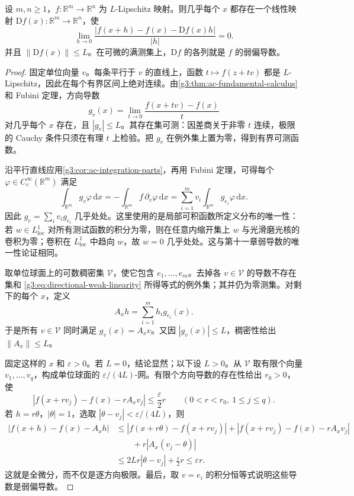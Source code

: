 \begin{theorem}[Rademacher 定理]\label{g3:thm:rademacher}
	设 \(m,n\ge1\)，\(f:\mathbb R^m\to\mathbb R^n\) 为 \(L\)-Lipschitz 映射。则几乎每个 \(x\) 都存在一个线性映射 \(\mathrm Df(x):\mathbb R^m\to\mathbb R^n\)，使
	\begin{equation}\label{g3:eq:rademacher-total-differential}
		\lim_{h\to0}\frac{|f(x+h)-f(x)-\mathrm Df(x)h|}{|h|}=0.
	\end{equation}
	并且 \(\|\mathrm Df(x)\|\le L\)。在可微的满测集上，\(\mathrm Df\) 的各列就是 \(f\) 的弱偏导数。
\end{theorem}
\begin{proof}
	固定单位向量 \(v\)。每条平行于 \(v\) 的直线上，函数 \(t\mapsto f(z+tv)\) 都是 \(L\)-Lipschitz，因此在每个有界区间上绝对连续。由\cref{g3:thm:ac-fundamental-calculus} 和 Fubini 定理，方向导数
	\[
		g_v(x)=\lim_{t\to0}\frac{f(x+tv)-f(x)}t
	\]
	对几乎每个 \(x\) 存在，且 \(|g_v|\le L\)。其存在集可测：因差商关于非零 \(t\) 连续，极限的 Cauchy 条件只须在有理 \(t\) 上检验。把 \(g_v\) 在例外集上置为零，得到有界可测函数。

	沿平行直线应用\cref{g3:cor:ac-integration-parts}，再用 Fubini 定理，可得每个 \(\varphi\in C_c^\infty(\mathbb R^m)\) 满足
	\begin{equation}\label{g3:eq:directional-weak-linearity}
		\int_{\mathbb R^m}g_v\varphi\,\mathrm dx
		=-\int_{\mathbb R^m}f\,\partial_v\varphi\,\mathrm dx
		=\sum_{i=1}^m v_i\int_{\mathbb R^m}g_{e_i}\varphi\,\mathrm dx.
	\end{equation}
	因此
	\(g_v=\sum_i v_i g_{e_i}\) 几乎处处。这里使用的是局部可积函数所定义分布的唯一性：若 \(w\in L^1_{\mathrm{loc}}\) 对所有测试函数的积分为零，则在任意内缩开集上 \(w\) 与光滑磨光核的卷积为零；卷积在 \(L^1_{\mathrm{loc}}\) 中趋向 \(w\)，故 \(w=0\) 几乎处处。这与第十一章弱导数的唯一性论证相同。

	取单位球面上的可数稠密集 \(\mathcal V\)，使它包含 \(e_1,\ldots,e_m\)。去掉各 \(v\in\mathcal V\) 的导数不存在集和 \eqref{g3:eq:directional-weak-linearity} 所得等式的例外集；其并仍为零测集。对剩下的每个 \(x\)，定义
	\[
		A_x h=\sum_{i=1}^m h_i g_{e_i}(x).
	\]
	于是所有 \(v\in\mathcal V\) 同时满足 \(g_v(x)=A_xv\)。又因 \(|g_v(x)|\le L\)，稠密性给出 \(\|A_x\|\le L\)。

	固定这样的 \(x\) 和 \(\varepsilon>0\)。若 \(L=0\)，结论显然；以下设 \(L>0\)。从 \(\mathcal V\) 取有限个向量 \(v_1,\ldots,v_q\)，构成单位球面的 \(\varepsilon/(4L)\)-网。有限个方向导数的存在性给出 \(r_0>0\)，使
	\[
		|f(x+rv_j)-f(x)-rA_xv_j|\le\frac\varepsilon2r
		\qquad(0<r<r_0,\ 1\le j\le q).
	\]
	若 \(h=r\theta\)，\(|\theta|=1\)，选取 \(|\theta-v_j|<\varepsilon/(4L)\)，则
	\begin{align*}
		|f(x+h)-f(x)-A_xh|
		&\le |f(x+r\theta)-f(x+rv_j)|
		 +|f(x+rv_j)-f(x)-rA_xv_j|\\
		&\qquad+r|A_x(v_j-\theta)|\\
		&\le 2Lr|\theta-v_j|+\frac\varepsilon2r
		\le\varepsilon r.
	\end{align*}
	这就是全微分，而不仅是逐方向极限。最后，取 \(v=e_i\) 的积分恒等式说明这些导数是弱偏导数。
\end{proof}


